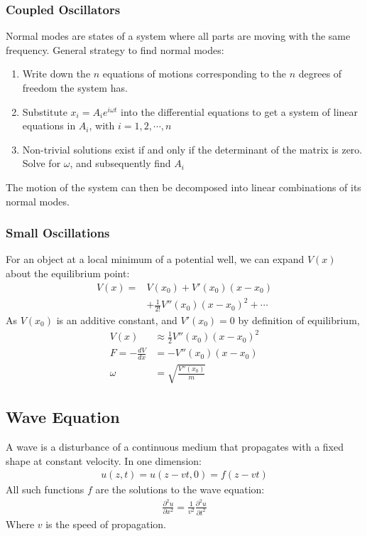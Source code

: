 \documentclass[11pt, letterpaper]{article}
\newcommand{\pd}[2]{
  \ensuremath{
    \frac{\partial #1}{\partial #2} }} %
\begin{document}
\begin{multicols*}{3}
\subsubsection{Coupled Oscillators}
Normal modes are states of a system where all parts are moving with the same
frequency. General strategy to find normal modes:
\begin{enumerate}
\item Write down the $n$ equations of motions corresponding to the $n$ degrees
  of freedom the system has.
\item Substitute $x_i=A_ie^{i\omega t}$ into the differential equations to get a
  system of linear equations in $A_i$, with $i=1,2,\cdots,n$
\item Non-trivial solutions exist if and only if the determinant of the matrix
  is zero. Solve for $\omega$, and subsequently find $A_i$
\end{enumerate}
The motion of the system can then be decomposed into linear combinations of its
normal modes.
\subsubsection{Small Oscillations}
For an object at a local minimum of a potential well, we can expand $V(x)$ about
the equilibrium point:
\begin{align*}
  V(x)=&V(x_0)+V'(x_0)(x-x_0)\\
  &+ \frac{1}{2!}V''(x_0)(x-x_0)^2+\cdots
\end{align*}
As $V(x_0)$ is an additive constant, and $V'(x_0)=0$ by definition of
equilibrium,
\begin{align*}
  V(x) &\approx \frac{1}{2}V''(x_0)(x-x_0)^2 \\
  F = -\frac{dV}{dx}&=-V''(x_0)(x-x_0) \\
  \omega&=\sqrt{\frac{V''(x_0)}{m}}
\end{align*}
\subsection{Wave Equation}
A wave is a disturbance of a continuous medium that propagates with a fixed
shape at constant velocity. In one dimension:
\begin{align*}
  u(z,t)=u(z-vt,0)=f(z-vt)
\end{align*}
All such functions $f$ are the solutions to the wave equation:
\begin{align*}
  \pd{^2 u}{x^2}=\frac{1}{v^2}\pd{^2 u}{t^2}
\end{align*}
Where $v$ is the speed of propagation.


\end{multicols*}
\end{document}
